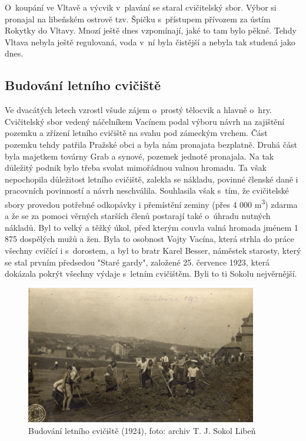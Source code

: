 \documentclass[a5paper, 11pt, twoside]{article}
\begin{document}
O~koupání ve Vltavě a výcvik v~plavání se staral cvičitelský sbor. Výbor
si pronajal na libeňském ostrově tzv. Špičku s~přístupem přívozem za
ústím Rokytky do Vltavy. Mnozí ještě dnes vzpomínají, jaké to tam bylo
pěkné. Tehdy Vltava nebyla ještě regulovaná, voda v~ní byla čistější a
nebyla tak studená jako dnes.

\subsection{Budování letního
cvičiště}

Ve dvacátých letech vzrostl všude zájem o~prostý tělocvik a hlavně
o~hry. Cvičitelský sbor vedený náčelníkem Vacínem podal výboru návrh na
zajištění pozemku a zřízení letního cvičiště na svahu pod zámeckým
vrchem. Část pozemku tehdy patřila Pražské obci a byla nám pronajata
bezplatně. Druhá část byla majetkem továrny Grab a synové, pozemek
jednotě pronajala. Na tak důležitý podnik bylo třeba svolat mimořádnou
valnou hromadu. Ta však nepochopila důležitost letního cvičiště, zalekla
se nákladu, povinné členské daně i pracovních povinností a návrh
neschválila. Souhlasila však s~tím, že cvičitelské sbory provedou
potřebné odkopávky i přemístění zeminy (přes 4 000 m\textsuperscript{3})
zdarma a že se za pomoci věrných starších členů postarají také o~úhradu
nutných nákladů. Byl to velký a těžký úkol, před kterým couvla valná
hromada jménem 1 875 dospělých mužů a žen. Byla to osobnost Vojty
Vacína, která strhla do práce všechny cvičící i s~dorostem, a byl to
bratr Karel Besser, náměstek starosty, který se stal prvním předsedou
"Staré gardy", založené 25. července 1923, která dokázala pokrýt
všechny výdaje s~letním cvičištěm. Byli to ti Sokolu nejvěrnější.

\begin{figure}[h!]
  \centering 
  \includegraphics[width=0.9\textwidth]{img/25_budovani_cviciste.jpg}
  \caption*{Budování letního cvičiště (1924), foto: archiv T. J. Sokol Libeň}
\end{figure}
\end{document}
